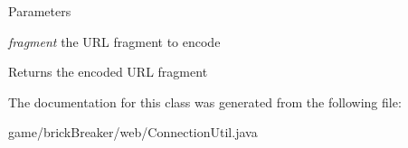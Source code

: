 \begin{DoxyParams}{Parameters}
\item[{\em fragment}]the URL fragment to encode \end{DoxyParams}
\begin{DoxyReturn}{Returns}
the encoded URL fragment 
\end{DoxyReturn}


The documentation for this class was generated from the following file:\begin{DoxyCompactItemize}
\item 
game/brickBreaker/web/ConnectionUtil.java\end{DoxyCompactItemize}
